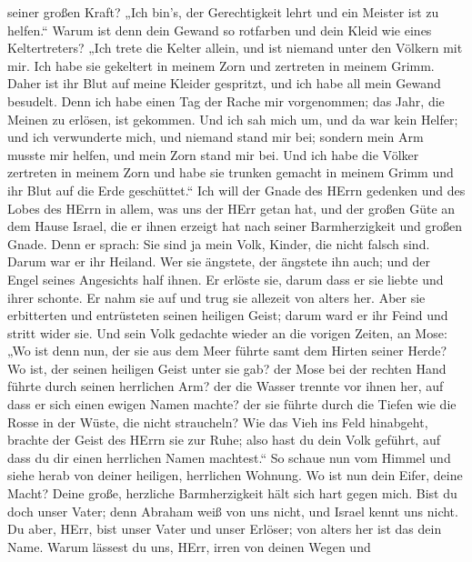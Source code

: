 seiner großen Kraft? „Ich bin's, der Gerechtigkeit lehrt und ein Meister
ist zu helfen.``  Warum ist denn dein Gewand so rotfarben
und dein Kleid wie eines Keltertreters?  „Ich trete die
Kelter allein, und ist niemand unter den Völkern mit mir. Ich habe sie
gekeltert in meinem Zorn und zertreten in meinem Grimm. Daher ist ihr
Blut auf meine Kleider gespritzt, und ich habe all mein Gewand besudelt.
 Denn ich habe einen Tag der Rache mir vorgenommen; das
Jahr, die Meinen zu erlösen, ist gekommen.  Und ich sah mich
um, und da war kein Helfer; und ich verwunderte mich, und niemand stand
mir bei; sondern mein Arm musste mir helfen, und mein Zorn stand mir
bei.  Und ich habe die Völker zertreten in meinem Zorn und
habe sie trunken gemacht in meinem Grimm und ihr Blut auf die Erde
geschüttet.``  Ich will der Gnade des HErrn gedenken und des
Lobes des HErrn in allem, was uns der HErr getan hat, und der großen
Güte an dem Hause Israel, die er ihnen erzeigt hat nach seiner
Barmherzigkeit und großen Gnade.  Denn er sprach: Sie sind
ja mein Volk, Kinder, die nicht falsch sind. Darum war er ihr Heiland.
 Wer sie ängstete, der ängstete ihn auch; und der Engel
seines Angesichts half ihnen. Er erlöste sie, darum dass er sie liebte
und ihrer schonte. Er nahm sie auf und trug sie allezeit von alters her.
 Aber sie erbitterten und entrüsteten seinen heiligen
Geist; darum ward er ihr Feind und stritt wider sie.  Und
sein Volk gedachte wieder an die vorigen Zeiten, an Mose: „Wo ist denn
nun, der sie aus dem Meer führte samt dem Hirten seiner Herde? Wo ist,
der seinen heiligen Geist unter sie gab?  der Mose bei der
rechten Hand führte durch seinen herrlichen Arm? der die Wasser trennte
vor ihnen her, auf dass er sich einen ewigen Namen machte? 
der sie führte durch die Tiefen wie die Rosse in der Wüste, die nicht
straucheln?  Wie das Vieh ins Feld hinabgeht, brachte der
Geist des HErrn sie zur Ruhe; also hast du dein Volk geführt, auf dass
du dir einen herrlichen Namen machtest.``  So schaue nun
vom Himmel und siehe herab von deiner heiligen, herrlichen Wohnung. Wo
ist nun dein Eifer, deine Macht? Deine große, herzliche Barmherzigkeit
hält sich hart gegen mich.  Bist du doch unser Vater; denn
Abraham weiß von uns nicht, und Israel kennt uns nicht. Du aber, HErr,
bist unser Vater und unser Erlöser; von alters her ist das dein Name.
 Warum lässest du uns, HErr, irren von deinen Wegen und
